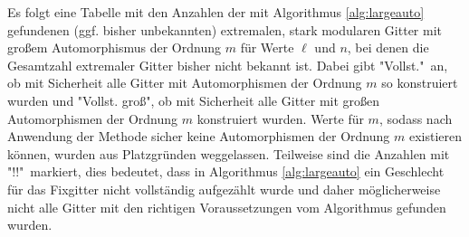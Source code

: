 \documentclass[12pt,a4paper,halfparskip,headsepline,bibtotocnumbered]{scrreprt}
\theoremstyle{nummermitklammern}
\theoremstyle{nonumberbreak}
\begin{document}
Es folgt eine Tabelle mit den Anzahlen der mit Algorithmus \eqref{alg:largeauto} gefundenen (ggf. bisher unbekannten) extremalen, stark modularen Gitter mit großem Automorphismus der Ordnung $m$ für Werte $\ell$ und $n$, bei denen die Gesamtzahl extremaler Gitter bisher nicht bekannt ist. Dabei gibt "Vollst."\ an, ob mit Sicherheit alle Gitter mit Automorphismen der Ordnung $m$ so konstruiert wurden und "Vollst. groß", ob mit Sicherheit alle Gitter mit großen Automorphismen der Ordnung $m$ konstruiert wurden. Werte für $m$, sodass nach Anwendung der Methode sicher keine Automorphismen der Ordnung $m$ existieren können, wurden aus Platzgründen weggelassen. Teilweise sind die Anzahlen mit "!!"\ markiert, dies bedeutet, dass in Algorithmus \eqref{alg:largeauto} ein Geschlecht für das Fixgitter nicht vollständig aufgezählt wurde und daher möglicherweise nicht alle Gitter mit den richtigen Voraussetzungen vom Algorithmus gefunden wurden.
\end{document}

